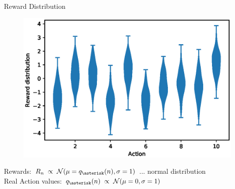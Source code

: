 \documentclass{beamer}
\begin{document}
\begin{frame}{Reward Distribution}
	\begin{figure}
	\centering
	\includegraphics[width=0.8\linewidth]{Images/figure_2_1.eps}\\
	\end{figure}
	Rewards: $R_n \hspace{0.1cm} \propto \hspace{0.1cm} \mathcal{N}(\mu=q_{\asterisk}(n), \sigma=1)$ ... normal distribution\\
	Real Action values: $q_{\asterisk}(n) \hspace{0.1cm} \propto \hspace{0.1cm} \mathcal{N}(\mu=0, \sigma=1)$
\end{frame}
\end{document}
